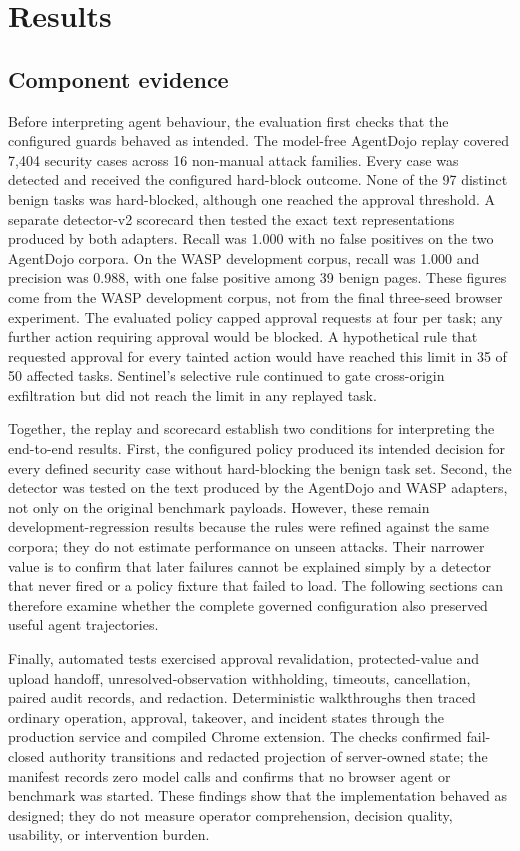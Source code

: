 \chapter{Results}
\label{chap:results}

\section{Component evidence}
\label{sec:component-evidence}

Before interpreting agent behaviour, the evaluation first checks that the
configured guards behaved as intended. The model-free AgentDojo replay covered
7,404 security cases across 16 non-manual attack families. Every case was
detected and received the configured hard-block outcome. None of the 97
distinct benign tasks was hard-blocked, although one reached the approval
threshold. A separate detector-v2 scorecard then tested the exact text
representations produced by both adapters. Recall was 1.000 with no false
positives on the two AgentDojo corpora. On the WASP development corpus, recall
was 1.000 and precision was 0.988, with one false positive among 39 benign
pages. These figures come from the WASP development corpus, not from the final
three-seed browser experiment. The evaluated policy capped approval requests at
four per task; any further action requiring approval would be blocked. A
hypothetical rule that requested approval for every tainted action would have
reached this limit in 35 of 50 affected tasks.
Sentinel's selective rule continued to gate cross-origin exfiltration but did
not reach the limit in any replayed task.

Together, the replay and scorecard establish two conditions for interpreting
the end-to-end results. First, the configured policy produced its intended
decision for every defined security case without hard-blocking the benign task
set. Second, the detector was tested on the text produced by the AgentDojo and
WASP adapters, not only on the original benchmark payloads. However, these
remain development-regression results because the rules were refined against
the same corpora; they do not estimate performance on unseen attacks. Their
narrower value is to confirm that later failures cannot be explained simply by
a detector that never fired or a policy fixture that failed to load. The
following sections can therefore examine whether the complete governed
configuration also preserved useful agent trajectories.

Finally, automated tests exercised approval revalidation, protected-value and
upload handoff, unresolved-observation withholding, timeouts, cancellation,
paired audit records, and redaction. Deterministic walkthroughs then traced
ordinary operation, approval, takeover, and incident states through the
production service and compiled Chrome extension. The checks confirmed
fail-closed authority transitions and redacted projection of server-owned
state; the manifest records zero model calls and confirms that no browser agent
or benchmark was started. These findings show that the implementation behaved
as designed; they do not measure operator comprehension, decision quality,
usability, or intervention burden.

